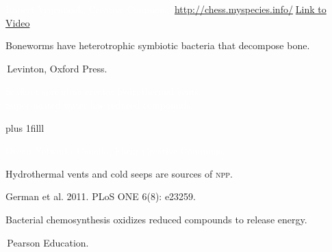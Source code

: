 \documentclass[t]{beamer}
\begin{document}
{
\begin{frame}[b]

\tiny\textcolor{white}{Robert Vrijenhoek, Creative Commons, \url{http://chess.myspecies.info/}.\hfill\href{https://www.youtube.com/watch?v=rdI3eFrTGs8}{Link to Video}}

\end{frame}}

{
\begin{frame}[b]{Boneworms have heterotrophic symbiotic bacteria that decompose bone.}


\tiny\textcopyright\,Levinton, Oxford Press.
\end{frame}}


{
\begin{frame}[t]

\vspace*{3\baselineskip}

\hspace*{65mm}\hangpara\parbox{49mm}{\raggedright \large\textcolor{white}{Seafloor spreading creates hydrothermal vents.\\[\baselineskip]
Super-heated water has reduced compounds.}}

\vskip0pt plus 1filll

\tiny\textcolor{white}{Ocean Networks Canada, Flickr Creative Commons.}
\end{frame}}

{
\begin{frame}[b]{Hydrothermal vents and cold seeps are sources of \textsc{npp}.}

\tiny\hfill German et al. 2011. PLoS ONE 6(8): e23259.
\end{frame}}



{
\begin{frame}[b]{Bacterial chemosynthesis oxidizes reduced compounds to release energy.}

\tiny\textcopyright\,Pearson Education.
\end{frame}}
\end{document}
